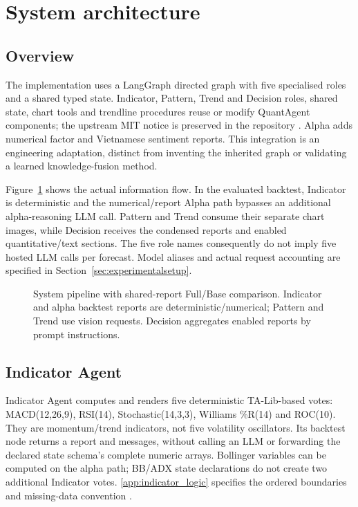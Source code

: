 \section{System architecture}
\label{sec:systemarchitecture}
\subsection{Overview}
The implementation uses a LangGraph directed graph with five specialised roles and a shared typed state. Indicator, Pattern, Trend and Decision roles, shared state, chart tools and trendline procedures reuse or modify QuantAgent components; the upstream MIT notice is preserved in the repository \cite{xiong2025quantagent}. Alpha adds numerical factor and Vietnamese sentiment reports. This integration is an engineering adaptation, distinct from inventing the inherited graph or validating a learned knowledge-fusion method.

Figure~\ref{fig:flow} shows the actual information flow. In the evaluated backtest, Indicator is deterministic and the numerical/report Alpha path bypasses an additional alpha-reasoning LLM call. Pattern and Trend consume their separate chart images, while Decision receives the condensed reports and enabled quantitative/text sections. The five role names consequently do not imply five hosted LLM calls per forecast. Model aliases and actual request accounting are specified in Section~\ref{sec:experimentalsetup}.

\begin{figure}[!htbp]
\centering

\caption{System pipeline with shared-report Full/Base comparison. Indicator and alpha backtest reports are deterministic/numerical; Pattern and Trend use vision requests. Decision aggregates enabled reports by prompt instructions.}
\label{fig:flow}
\end{figure}

\subsection{Indicator Agent}
Indicator Agent computes and renders five deterministic TA-Lib-based votes: MACD(12,26,9), RSI(14), Stochastic(14,3,3), Williams \%R(14) and ROC(10). They are momentum/trend indicators, not five volatility oscillators. Its backtest node returns a report and messages, without calling an LLM or forwarding the declared state schema's complete numeric arrays. Bollinger variables can be computed on the alpha path; BB/ADX state declarations do not create two additional Indicator votes. \ref{app:indicator_logic} specifies the ordered boundaries and missing-data convention \cite{talib_rsi_docs,talib_willr_docs}.

